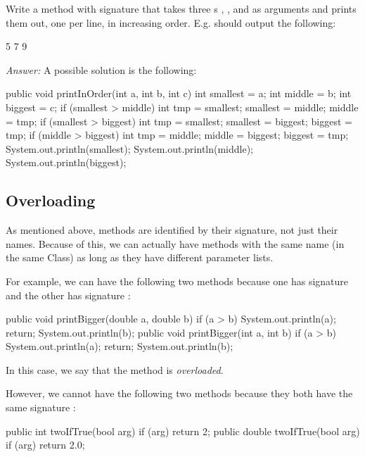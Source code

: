 \begin{example}
Write a method with signature  that takes
three s , , and  as arguments and prints them out,
one per line, in increasing order. E.g.  should output the following:
\begin{code}
5
7
9
\end{code}

\noindent \emph{Answer:}
A possible solution is the following:
\begin{code}
public void printInOrder(int a, int b, int c) {
  int smallest = a;
  int middle = b;
  int biggest = c;
  if (smallest > middle) {
    int tmp = smallest;
    smallest = middle;
    middle = tmp;
  }
  if (smallest > biggest) {
    int tmp = smallest;
    smallest = biggest;
    biggest = tmp;
  }
  if (middle > biggest) {
    int tmp = middle;
    middle = biggest;
    biggest = tmp;
  }
  System.out.println(smallest);
  System.out.println(middle);
  System.out.println(biggest);
}
\end{code}
\end{example}

\subsection{Overloading}
As mentioned above, methods are identified by their signature, not just their names.
Because of this, we can actually have methods with the same name (in the same
Class) as long as they have different parameter lists.

For example, we can have the following two methods because
one has signature  and the other
has signature :
\begin{code}
public void printBigger(double a, double b) {
  if (a > b) {
    System.out.println(a);
    return;
  }
  System.out.println(b);
}
public void printBigger(int a, int b) {
  if (a > b) {
    System.out.println(a);
    return;
  }
  System.out.println(b);
}
\end{code}
In this case, we say that the  method is \emph{overloaded}.

However, we cannot have the following two methods because they both have the
same signature :
\begin{code}
public int twoIfTrue(bool arg) {
  if (arg) {
    return 2;
  }
}
public double twoIfTrue(bool arg) {
  if (arg) {
    return 2.0;
  }
}
\end{code}


